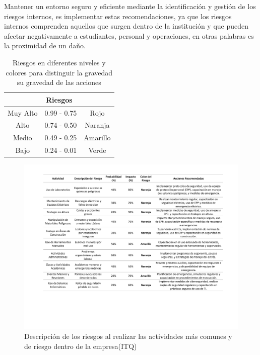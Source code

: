     Mantener un entorno seguro y eficiente mediante la identificación y gestión de los riesgos internos, es implementar estas recomendaciones, ya que los riesgos internos comprenden aquellos que surgen dentro de la institución y que pueden afectar negativamente a estudiantes, personal y operaciones, en otras palabras es la proximidad de un daño.
    \begin{table}[h]
        \centering
        \caption{Riesgos en diferentes niveles y colores para distinguir la gravedad su gravedad de las acciones}
        \begin{tabular}{c c c}
        \hline
        \multicolumn{3}{c}{Riesgos}\\
        \hline
              Muy Alto& 0.99 - 0.75 & Rojo  \\
        \hline
              Alto& 0.74 - 0.50 & Naranja  \\
        \hline
             Medio& 0.49 - 0.25 & Amarillo  \\
        \hline
             Bajo& 0.24 - 0.01 & Verde \\
        \hline     
        \end{tabular}
        \label{tab:riesgos}
    \end{table}
    \begin{figure}[H]
        \centering
        \includegraphics[trim = {30mm 80mm 30mm 26mm},clip,scale=0.30]{1/img/tabla-riesgos.pdf}
        \caption{Descripción de los riesgos al realizar las actividades más comunes y de riesgo dentro de la empresa(ITQ)}
    \end{figure}
